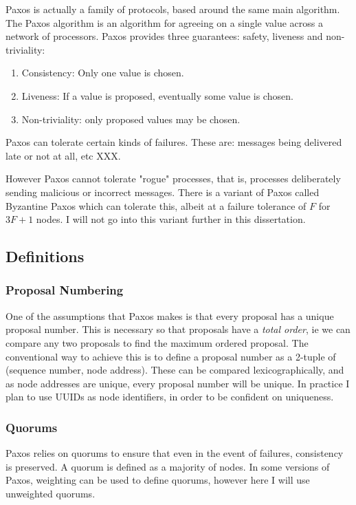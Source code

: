 \documentclass[12pt,twoside,notitlepage]{report}
\begin{document}
Paxos is actually a family of protocols, based around the same main algorithm. The Paxos algorithm
is an algorithm for agreeing on a single value across a network of processors. Paxos provides
three guarantees: safety, liveness and non-triviality:

\begin{enumerate}
	\item Consistency: Only one value is chosen.
	\item Liveness: If a value is proposed, eventually some value is chosen.
	\item Non-triviality: only proposed values may be chosen.
\end{enumerate}

Paxos can tolerate certain kinds of failures. These are: messages being delivered late or not at
all, etc XXX.

However Paxos cannot tolerate "rogue" processes, that is, processes deliberately sending malicious
or incorrect messages. There is a variant of Paxos called Byzantine Paxos which can tolerate this,
albeit at a failure tolerance of $F$ for $3F + 1$ nodes. I will not go into this variant further
in this dissertation.

\subsection{Definitions}

\subsubsection*{Proposal Numbering}

One of the assumptions that Paxos makes is that every proposal has a unique proposal number. This
is necessary so that proposals have a \emph{total order}, ie we can compare any two proposals to
find the maximum ordered proposal. The conventional way to achieve this is to define a proposal
number as a 2-tuple of (sequence number, node address). These can be compared lexicographically,
and as node addresses are unique, every proposal number will be unique. In practice I plan to use
UUIDs as node identifiers, in order to be confident on uniqueness.

\subsubsection*{Quorums}

Paxos relies on quorums to ensure that even in the event of failures, consistency is preserved. A
quorum is defined as a majority of nodes. In some versions of Paxos, weighting can be used to
define quorums, however here I will use unweighted quorums.
\end{document}
